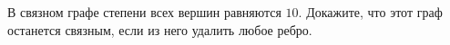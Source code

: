 В связном графе степени всех вершин равняются $10$. Докажите, что этот граф останется связным, если из
него удалить любое ребро.
